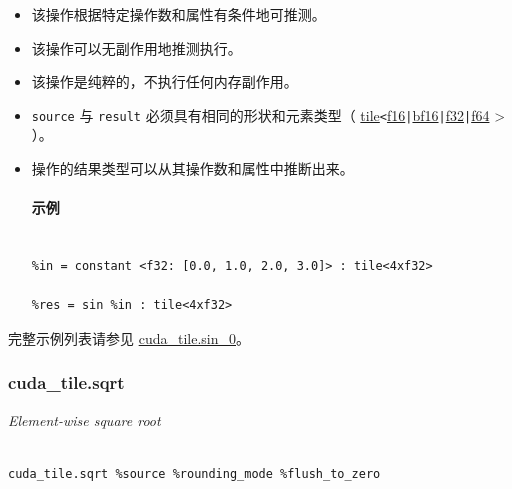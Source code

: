 \documentclass{article}
\begin{document}
\begin{itemize}
\item 该操作根据特定操作数和属性有条件地可推测。
\item 该操作可以无副作用地推测执行。
\item 该操作是纯粹的，不执行任何内存副作用。
\item \texttt{source} 与 \texttt{result} 必须具有相同的形状和元素类型（ \href{https://docs.nvidia.com/cuda/tile-ir/latest/sections/types.html#type-tile}{tile}\texttt{<}\href{https://docs.nvidia.com/cuda/tile-ir/latest/sections/types.html#subsection-element-types}{f16}\texttt{|}\href{https://docs.nvidia.com/cuda/tile-ir/latest/sections/types.html#subsection-element-types}{bf16}\texttt{|}\href{https://docs.nvidia.com/cuda/tile-ir/latest/sections/types.html#subsection-element-types}{f32}\texttt{|}\href{https://docs.nvidia.com/cuda/tile-ir/latest/sections/types.html#subsection-element-types}{f64} > ）。
\item 操作的结果类型可以从其操作数和属性中推断出来。




\paragraph{示例}


\begin{lstlisting}

%in = constant <f32: [0.0, 1.0, 2.0, 3.0]> : tile<4xf32>

%res = sin %in : tile<4xf32>

\end{lstlisting}



\end{itemize}
完整示例列表请参见 \href{https://docs.nvidia.com/cuda/tile-ir/latest/sections/appendix.html#example-cuda-tile-sin-0}{cuda\_tile.sin\_0}。





\subsubsection{cuda\_tile.sqrt}


\textit{Element-wise square root}




\begin{lstlisting}

cuda_tile.sqrt %source %rounding_mode %flush_to_zero

\end{lstlisting}
\end{document}
